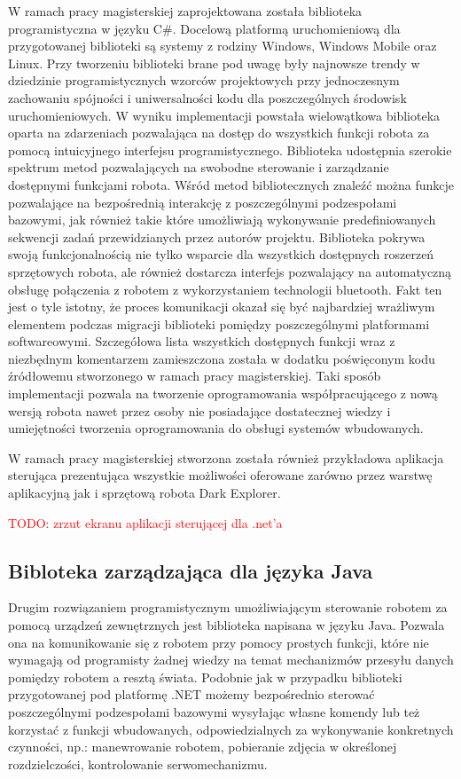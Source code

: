 W ramach pracy magisterskiej zaprojektowana została biblioteka programistyczna w
języku C\#. Docelową platformą uruchomieniową dla przygotowanej biblioteki są
systemy z rodziny Windows, Windows Mobile oraz Linux. Przy tworzeniu biblioteki
brane pod uwagę były najnowsze trendy w dziedzinie programistycznych wzorców
projektowych przy jednoczesnym zachowaniu spójności i uniwersalności kodu dla
poszczególnych środowisk uruchomieniowych. W wyniku implementacji powstała
wielowątkowa biblioteka oparta na zdarzeniach pozwalająca na dostęp do wszystkich
funkcji robota za pomocą intuicyjnego interfejsu programistycznego. Biblioteka
udostępnia szerokie spektrum metod pozwalających na swobodne sterowanie i
zarządzanie dostępnymi funkcjami robota. Wśród metod bibliotecznych znaleźć można
funkcje pozwalające na bezpośrednią interakcję z poszczególnymi podzespołami
bazowymi, jak również takie które umożliwiają wykonywanie predefiniowanych
sekwencji zadań przewidzianych przez autorów projektu. Biblioteka pokrywa swoją
funkcjonalnością nie tylko wsparcie dla wszystkich dostępnych roszerzeń
sprzętowych robota, ale również dostarcza interfejs pozwalający na automatyczną
obsługę połączenia z robotem z wykorzystaniem technologii bluetooth. Fakt ten
jest o tyle istotny, że proces komunikacji okazał się być najbardziej wrażliwym
elementem podczas migracji biblioteki pomiędzy poszczególnymi platformami
softwareowymi. Szczegółowa lista wszystkich dostępnych funkcji wraz z niezbędnym
komentarzem zamieszczona została w dodatku poświęconym kodu źródłowemu
stworzonego w ramach pracy magisterskiej. Taki sposób implementacji pozwala na
tworzenie oprogramowania współpracującego z nową wersją robota nawet przez osoby
nie posiadające dostatecznej wiedzy i umiejętności tworzenia oprogramowania do
obsługi systemów wbudowanych.

W ramach pracy magisterskiej stworzona została również przykładowa aplikacja
sterująca prezentująca wszystkie możliwości oferowane zarówno przez warstwę
aplikacyjną jak i sprzętową robota Dark Explorer. 

\textcolor{red}{TODO: zrzut ekranu aplikacji sterującej dla .net'a}

\subsection{Bibloteka zarządzająca dla języka Java}
Drugim rozwiązaniem programistycznym umożliwiającym sterowanie robotem za pomocą urządzeń zewnętrznych jest biblioteka napisana w języku Java. Pozwala ona na komunikowanie się z robotem przy pomocy prostych funkcji, które nie wymagają od programisty żadnej wiedzy na temat mechanizmów przesyłu danych pomiędzy robotem a resztą świata. Podobnie jak w przypadku biblioteki przygotowanej pod platformę .NET możemy bezpośrednio sterować poszczególnymi podzespołami bazowymi wysyłając własne komendy lub też korzystać z funkcji wbudowanych, odpowiedzialnych za wykonywanie konkretnych czynności, np.: manewrowanie robotem, pobieranie zdjęcia w określonej rozdzielczości, kontrolowanie serwomechanizmu.

